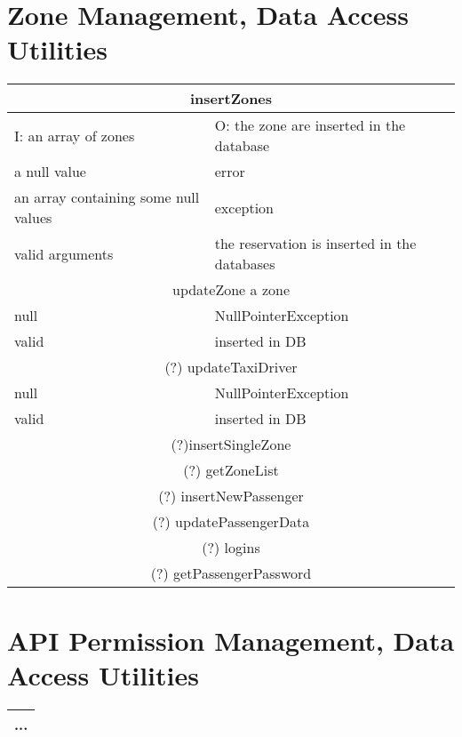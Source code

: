 \documentclass[11pt,oneside,a4paper]{report}
\begin{document}
\section{Zone Management, Data Access Utilities}
\begin{tabular}{p{5cm}|p{6cm}}
	\hline
	\multicolumn{2}{c}{insertZones}\\\hline
	I: an array of zones &
	O:  the zone are inserted in the database \\\hline
	a null value &
	error\\\hline
	an array containing some null values &
	exception\\\hline
	valid arguments &
	the reservation is inserted in the databases \\\hline\hline
	
	\multicolumn{2}{c}{updateZone
	a zone}\\\hline
	null &
	NullPointerException \\\hline
	valid &
	inserted in DB \\\hline\hline
	
	\multicolumn{2}{c}{(?) updateTaxiDriver}\\\hline
	null &
	NullPointerException \\\hline
	valid &
	inserted in DB \\\hline
	
	\multicolumn{2}{c}{(?)insertSingleZone}\\\hline
	
	\multicolumn{2}{c}{(?) getZoneList}\\
	
	\multicolumn{2}{c}{
	(?) insertNewPassenger}\\
	
		\multicolumn{2}{c}{
	(?) updatePassengerData}\\
		\multicolumn{2}{c}{
	(?) logins}\\
	\multicolumn{2}{c}{	(?) getPassengerPassword}\\\hline
	
\end{tabular}


\section{API Permission Management, Data Access Utilities}
\begin{tabular}{p{5cm}|p{6cm}}
	\hline
	\multicolumn{2}{c}{...}\\\hline
\end{tabular}
\end{document}
